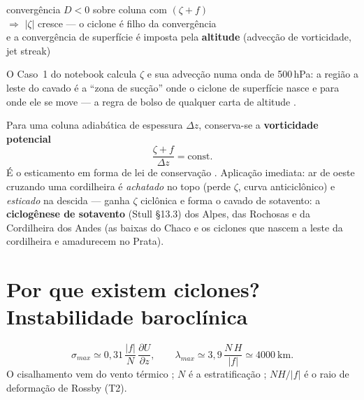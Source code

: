 \documentclass[11pt]{article}
\begin{document}
\begin{noquadro}
convergência $D<0$ sobre coluna com $(\zeta + f)$\\
$\Rightarrow$ $|\zeta|$ cresce — o ciclone é filho da convergência\\
e a convergência de superfície é imposta pela \textbf{altitude}
(advecção de vorticidade, jet streak)
\end{noquadro}

O Caso~1 do notebook calcula $\zeta$ e sua advecção numa onda de
500\,hPa: a região a leste do cavado é a ``zona de sucção'' onde o
ciclone de superfície nasce e para onde ele se move — a regra de bolso
de qualquer carta de altitude .

\begin{formadif}
Para uma coluna adiabática de espessura $\Delta z$, conserva-se a
\textbf{vorticidade potencial}
\[ \frac{\zeta + f}{\Delta z} = \text{const}. \]
É o esticamento em forma de lei de conservação
. Aplicação imediata: ar de oeste
cruzando uma cordilheira é \emph{achatado} no topo (perde $\zeta$,
curva anticiclônico) e \emph{esticado} na descida — ganha $\zeta$
ciclônica e forma o cavado de sotavento: a \textbf{ciclogênese de
sotavento} (Stull \S13.3) dos Alpes, das Rochosas e da Cordilheira
dos Andes (as baixas do Chaco e os ciclones que nascem a leste da
cordilheira e amadurecem no Prata).
\end{formadif}

\section{Por que existem ciclones? Instabilidade baroclínica}
\label{sec:eady}


\begin{formalivro}
\[ \sigma_{max} \simeq 0{,}31\,\frac{|f|}{N}\,
\frac{\partial U}{\partial z},\qquad
\lambda_{max} \simeq 3{,}9\,\frac{N\,H}{|f|} \simeq 4000\ \mathrm{km}. \]
O cisalhamento vem do vento térmico ; $N$ é
a estratificação ; $NH/|f|$ é o raio de
deformação de Rossby (T2).
\end{formalivro}
\end{document}
